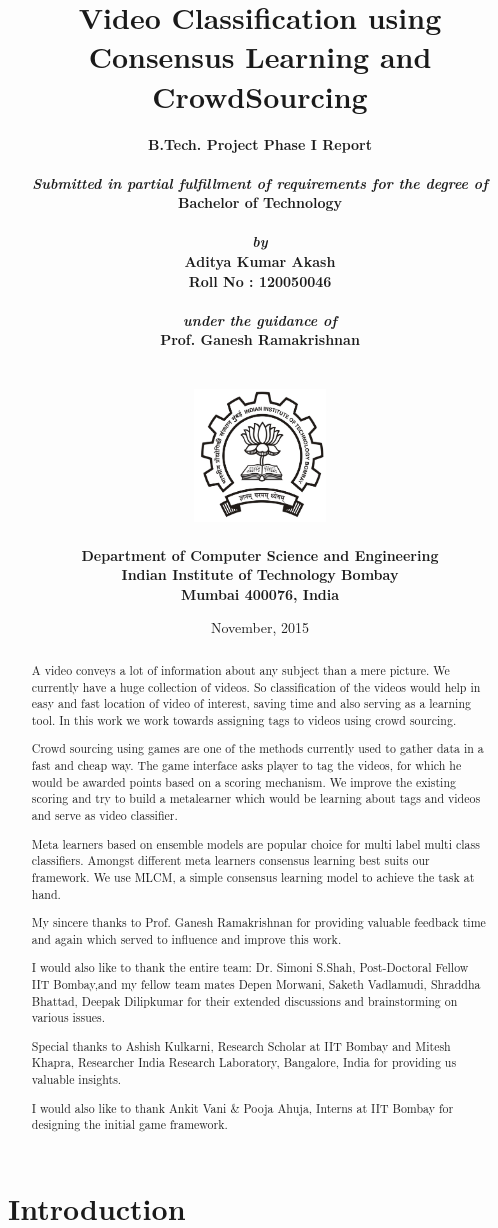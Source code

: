 \documentclass[12pt]{report}
\title{\textbf{Video Classification using Consensus Learning and CrowdSourcing}}
\author{
		\bf{B.Tech. Project Phase I Report}\\
        \\
        \emph{Submitted in partial fulfillment of requirements for the degree of}\\
        \bf{Bachelor of Technology}\\
        \\
        \emph{by}\\
		\bf{Aditya Kumar Akash}\\
        \bf{Roll No : 120050046}\\
        \\
        \emph{under the guidance of}\\
		\bf{Prof. Ganesh Ramakrishnan}\\
        \\\\
        \includegraphics[height=3.5cm]{./iitb_logo.jpg}\\
        \\
		\bf{Department of Computer Science and Engineering}\\
        \bf{Indian Institute of Technology Bombay}\\
        \bf{Mumbai 400076, India}\\
}
\date{November, 2015}
\begin{document}
\maketitle
\pagebreak
\tableofcontents
\pagebreak

\begin{abstract}
A video conveys a lot of information about any subject than a mere picture. We currently have a huge collection of videos. So classification of the videos would help in easy and fast location of video of interest, saving time and also serving as a learning tool. In this work we work towards assigning tags to videos using crowd sourcing.

Crowd sourcing using games are one of the methods currently used to gather data in a fast and cheap way. The game interface asks player to tag the videos, for which he would be awarded points based on a scoring mechanism. We improve the existing scoring and try to build a metalearner which would be learning about tags and videos and serve as video classifier.
 
Meta learners based on ensemble models are popular choice for multi label multi class classifiers. Amongst different meta learners  consensus learning best suits our framework. We use MLCM, a simple consensus learning model to achieve the task at hand.
\end{abstract}
\pagebreak

\renewcommand{\abstractname}{Acknowledgements}
\begin{abstract}
My sincere thanks to Prof. Ganesh Ramakrishnan for providing valuable feedback time and again which served to influence and improve this work.

I would also like to thank the entire team: Dr. Simoni S.Shah, Post-Doctoral Fellow IIT Bombay,and my fellow team mates Depen Morwani, Saketh Vadlamudi, Shraddha Bhattad, Deepak Dilipkumar for their extended discussions and brainstorming on various issues.

Special thanks to Ashish Kulkarni, Research Scholar at IIT Bombay and Mitesh Khapra, Researcher India Research Laboratory, Bangalore, India for providing us valuable insights.

I would also like to thank Ankit Vani \& Pooja Ahuja, Interns at IIT Bombay for designing the initial game framework.
\end{abstract}
\pagebreak

\chapter{Introduction}
\end{document}
